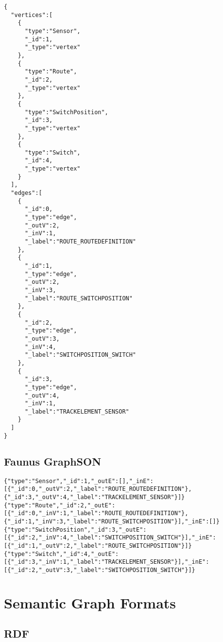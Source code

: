 \lstset{language=json,firstnumber=1}
\begin{lstlisting}[caption=A graph based on the railway system metamodel stored in Blueprints \graphson{} format]
{
  "vertices":[
    {
      "type":"Sensor",
      "_id":1,
      "_type":"vertex"
    },
    {
      "type":"Route",
      "_id":2,
      "_type":"vertex"
    },
    {
      "type":"SwitchPosition",
      "_id":3,
      "_type":"vertex"
    },
    {
      "type":"Switch",
      "_id":4,
      "_type":"vertex"
    }
  ],
  "edges":[
    {
      "_id":0,
      "_type":"edge",
      "_outV":2,
      "_inV":1,
      "_label":"ROUTE_ROUTEDEFINITION"
    },
    {
      "_id":1,
      "_type":"edge",
      "_outV":2,
      "_inV":3,
      "_label":"ROUTE_SWITCHPOSITION"
    },
    {
      "_id":2,
      "_type":"edge",
      "_outV":3,
      "_inV":4,
      "_label":"SWITCHPOSITION_SWITCH"
    },
    {
      "_id":3,
      "_type":"edge",
      "_outV":4,
      "_inV":1,
      "_label":"TRACKELEMENT_SENSOR"
    }
  ]
}
\end{lstlisting}

\subsection{Faunus GraphSON}
\label{subsec:faunus-graphson}

\begin{lstlisting}[caption=A graph based on the railway system metamodel stored in Faunus \graphson{} format]
{"type":"Sensor","_id":1,"_outE":[],"_inE":[{"_id":0,"_outV":2,"_label":"ROUTE_ROUTEDEFINITION"},{"_id":3,"_outV":4,"_label":"TRACKELEMENT_SENSOR"}]}
{"type":"Route","_id":2,"_outE":[{"_id":0,"_inV":1,"_label":"ROUTE_ROUTEDEFINITION"},{"_id":1,"_inV":3,"_label":"ROUTE_SWITCHPOSITION"}],"_inE":[]}
{"type":"SwitchPosition","_id":3,"_outE":[{"_id":2,"_inV":4,"_label":"SWITCHPOSITION_SWITCH"}],"_inE":[{"_id":1,"_outV":2,"_label":"ROUTE_SWITCHPOSITION"}]}
{"type":"Switch","_id":4,"_outE":[{"_id":3,"_inV":1,"_label":"TRACKELEMENT_SENSOR"}],"_inE":[{"_id":2,"_outV":3,"_label":"SWITCHPOSITION_SWITCH"}]}
\end{lstlisting}

\section{Semantic Graph Formats}

\subsection{RDF}
\label{subsec:rdf}

